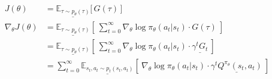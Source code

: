 \begin{align*}
    J(\theta)
        &= \underline{\mathbb{E}_{\tau\sim p_\theta(\tau)}} \big\lbrack\, G(\tau) \,\big\rbrack \\
    \nabla_\theta J(\theta)
        &= \underline{\mathbb{E}_{\tau\sim p_\theta(\tau)}} \left\lbrack\ \sum_{t=0}^{\infty} \nabla_\theta\log \pi_\theta(a_t|s_t)\cdot G(\tau) \ \right\rbrack \\
        &= \underline{\mathbb{E}_{\tau\sim p_\theta(\tau)}} \left\lbrack\ \sum_{t=0}^{\infty} \nabla_\theta\log \pi_\theta(a_t|s_t)\cdot \underline{\gamma^t G_t} \ \right\rbrack \\
        &= \sum_{t=0}^{\infty} \underline{\mathbb{E}_{s_t,a_t \sim p_t(s_t,a_t)}} \left\lbrack\ \nabla_\theta\log \pi_\theta(a_t|s_t)\cdot \underline{\gamma^t Q^{\pi_\theta}(s_t, a_t)} \ \right\rbrack
\end{align*}